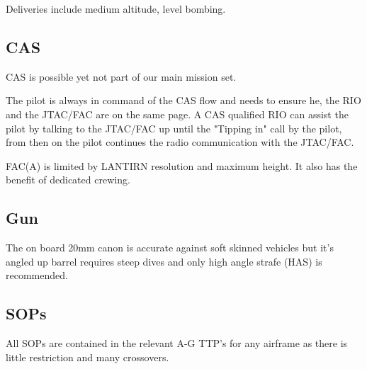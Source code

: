 Deliveries include medium altitude, level bombing.


\subsection{CAS}

CAS is possible yet not part of our main mission set.

The pilot is always in command of the CAS flow and needs to ensure he, the RIO
and the JTAC/FAC are on the same page. A CAS qualified RIO can assist the pilot
by talking to the JTAC/FAC up until the "Tipping in" call by the pilot, from
then on the pilot continues the radio communication with the JTAC/FAC.

FAC(A) is limited by LANTIRN resolution and maximum height. It also has the
benefit of dedicated crewing.

\subsection{Gun}

The on board 20mm canon is accurate against soft skinned vehicles but it's
angled up barrel requires steep dives and only high angle strafe (HAS) is
recommended.

\subsection{SOPs}

All SOPs are contained in the relevant A-G TTP's for any airframe as there is
little restriction and many crossovers.
